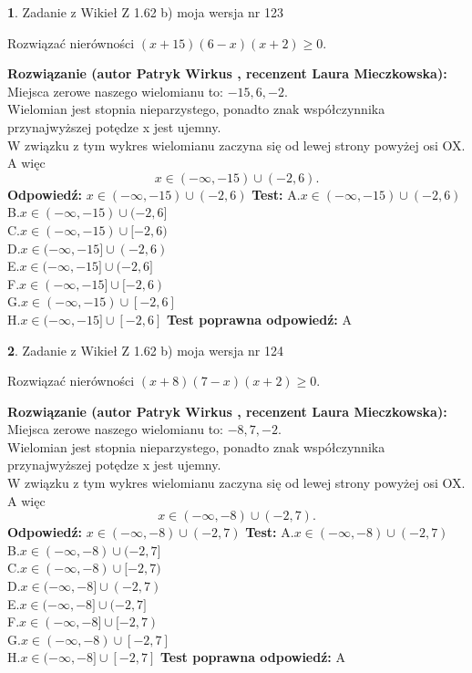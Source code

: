 \documentclass[12pt, a4paper]{article}
\theoremstyle{definition} %
\newtheorem{zad}{}
\newcommand{\zadStart}[1]{\begin{zad}#1\newline}
\newcommand{\zadStop}{\end{zad}}
\newcommand{\rozwStart}[2]{\noindent \textbf{Rozwiązanie (autor #1 , recenzent #2): }\newline}
\newcommand{\rozwStop}{\newline}
\newcommand{\odpStart}{\noindent \textbf{Odpowiedź:}\newline}
\newcommand{\odpStop}{\newline}
\newcommand{\testStart}{\noindent \textbf{Test:}\newline}
\newcommand{\testStop}{\newline}
\newcommand{\kluczStart}{\noindent \textbf{Test poprawna odpowiedź:}\newline}
\newcommand{\kluczStop}{\newline}
\begin{document}
\zadStart{Zadanie z Wikieł Z 1.62 b) moja wersja nr 123}

Rozwiązać nierówności $(x+15)(6-x)(x+2)\ge0$.
\zadStop
\rozwStart{Patryk Wirkus}{Laura Mieczkowska}
Miejsca zerowe naszego wielomianu to: $-15, 6, -2$.\\
Wielomian jest stopnia nieparzystego, ponadto znak współczynnika przy\linebreak najwyższej potędze x jest ujemny.\\ W związku z tym wykres wielomianu zaczyna się od lewej strony powyżej osi OX. A więc $$x \in (-\infty,-15) \cup (-2,6).$$
\rozwStop
\odpStart
$x \in (-\infty,-15) \cup (-2,6)$
\odpStop
\testStart
A.$x \in (-\infty,-15) \cup (-2,6)$\\
B.$x \in (-\infty,-15) \cup (-2,6]$\\
C.$x \in (-\infty,-15) \cup [-2,6)$\\
D.$x \in (-\infty,-15] \cup (-2,6)$\\
E.$x \in (-\infty,-15] \cup (-2,6]$\\
F.$x \in (-\infty,-15] \cup [-2,6)$\\
G.$x \in (-\infty,-15) \cup [-2,6]$\\
H.$x \in (-\infty,-15] \cup [-2,6]$
\testStop
\kluczStart
A
\kluczStop



\zadStart{Zadanie z Wikieł Z 1.62 b) moja wersja nr 124}

Rozwiązać nierówności $(x+8)(7-x)(x+2)\ge0$.
\zadStop
\rozwStart{Patryk Wirkus}{Laura Mieczkowska}
Miejsca zerowe naszego wielomianu to: $-8, 7, -2$.\\
Wielomian jest stopnia nieparzystego, ponadto znak współczynnika przy\linebreak najwyższej potędze x jest ujemny.\\ W związku z tym wykres wielomianu zaczyna się od lewej strony powyżej osi OX. A więc $$x \in (-\infty,-8) \cup (-2,7).$$
\rozwStop
\odpStart
$x \in (-\infty,-8) \cup (-2,7)$
\odpStop
\testStart
A.$x \in (-\infty,-8) \cup (-2,7)$\\
B.$x \in (-\infty,-8) \cup (-2,7]$\\
C.$x \in (-\infty,-8) \cup [-2,7)$\\
D.$x \in (-\infty,-8] \cup (-2,7)$\\
E.$x \in (-\infty,-8] \cup (-2,7]$\\
F.$x \in (-\infty,-8] \cup [-2,7)$\\
G.$x \in (-\infty,-8) \cup [-2,7]$\\
H.$x \in (-\infty,-8] \cup [-2,7]$
\testStop
\kluczStart
A
\kluczStop
\end{document}
